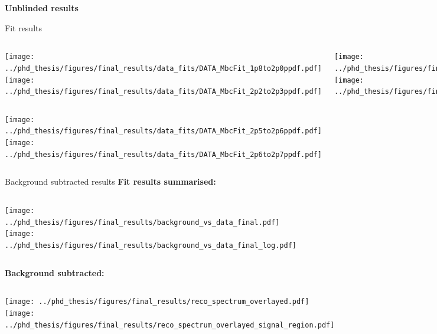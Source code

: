 \documentclass[xcolor=dvipsnames]{beamer}
\begin{document}
\addtocounter{framenumber}{-1}
{ 
\begin{frame}
   \centering
   \textbf{Unblinded results}
\end{frame}
}

\begin{frame}{Fit results}
\begin{columns}
   \centering
   \texttt{[image: ../phd\_thesis/figures/final\_results/data\_fits/DATA\_MbcFit\_1p8to2p0ppdf.pdf]}
   \texttt{[image: ../phd\_thesis/figures/final\_results/data\_fits/DATA\_MbcFit\_2p2to2p3ppdf.pdf]}

   \centering
   \texttt{[image: ../phd\_thesis/figures/final\_results/data\_fits/DATA\_MbcFit\_2p0to2p1ppdf.pdf]}
   \texttt{[image: ../phd\_thesis/figures/final\_results/data\_fits/DATA\_MbcFit\_2p3to2p4ppdf.pdf]}

   \centering
   \texttt{[image: ../phd\_thesis/figures/final\_results/data\_fits/DATA\_MbcFit\_2p1to2p2ppdf.pdf]}
   \texttt{[image: ../phd\_thesis/figures/final\_results/data\_fits/DATA\_MbcFit\_2p4to2p5ppdf.pdf]}
\end{columns}
\begin{columns}
   \centering
   \texttt{[image: ../phd\_thesis/figures/final\_results/data\_fits/DATA\_MbcFit\_2p5to2p6ppdf.pdf]}
   \centering
   \texttt{[image: ../phd\_thesis/figures/final\_results/data\_fits/DATA\_MbcFit\_2p6to2p7ppdf.pdf]}

\end{columns}
\end{frame}



\begin{frame}{Background subtracted results}
   \centering\scriptsize
\textbf{Fit results summarised:}
\begin{columns}
   \centering
   \texttt{[image: ../phd\_thesis/figures/final\_results/background\_vs\_data\_final.pdf]}
   \centering
   \texttt{[image: ../phd\_thesis/figures/final\_results/background\_vs\_data\_final\_log.pdf]}
\end{columns}
\textbf{Background subtracted:}

\begin{columns}
   \centering
   \texttt{[image: ../phd\_thesis/figures/final\_results/reco\_spectrum\_overlayed.pdf]}
   \centering
   \texttt{[image: ../phd\_thesis/figures/final\_results/reco\_spectrum\_overlayed\_signal\_region.pdf]}
\end{columns}

\end{frame}
\end{document}
